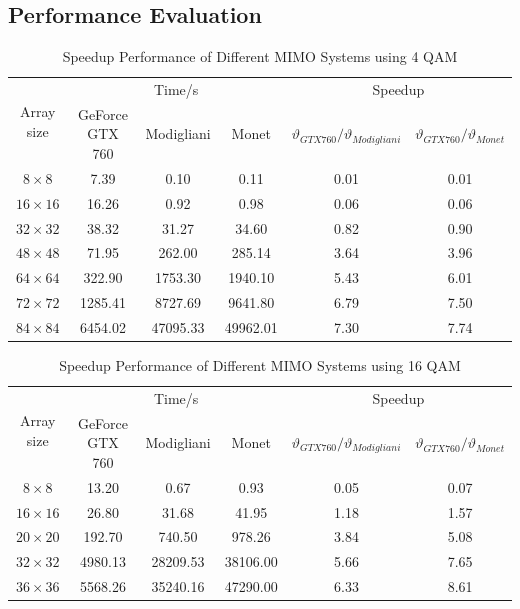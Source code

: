 \documentclass[letterpaper, 10pt, conference,twoside]{ieeeconf}
\begin{document}
\subsection{Performance Evaluation}
\begin{table}[htb]
\centering
\caption{ Speedup Performance of Different MIMO Systems using 4 QAM}
\begin{tabular}{|c|c|c|c|c|c|}
\hline
\multirow{2}{*}{ Array size} & \multicolumn{3}{|c|}{Time/s} & \multicolumn{2}{|c|}{Speedup}\\
\cline{2-6}
&GeForce GTX 760 & Modigliani & Monet &  $\vartheta_{GTX 760}/\vartheta_{Modigliani}$  & $\vartheta_{GTX 760}/\vartheta_{Monet}$ \\
\hline
$8\times 8$& 7.39& 0.10&0.11 & 0.01& 0.01\\
\hline
$16\times 16$&16.26 & 0.92&0.98& 0.06& 0.06\\
\hline
$32\times 32$&38.32 & 31.27& 34.60& 0.82& 0.90\\
\hline
$48\times 48$&71.95& 262.00& 285.14& 3.64& 3.96\\
\hline
$64\times 64$& 322.90&1753.30&1940.10&5.43& 6.01 \\
\hline
$72\times 72 $&1285.41&8727.69 &9641.80 &6.79 &7.50 \\
\hline
$84\times 84$ &6454.02&47095.33&49962.01&7.30&7.74\\
\hline
\end{tabular}
\label{speedup1}
\end{table}
\begin{table}[htb]
\centering
\caption{ Speedup Performance of Different MIMO Systems using 16 QAM}
\begin{tabular}{|c|c|c|c|c|c|}
\hline
\multirow{2}{*}{ Array size} & \multicolumn{3}{|c|}{Time/s} & \multicolumn{2}{|c|}{Speedup}\\
\cline{2-6}
&GeForce GTX 760 & Modigliani & Monet &  $\vartheta_{GTX 760}/\vartheta_{Modigliani}$  &  $\vartheta_{GTX 760}/\vartheta_{Monet}$ \\
\hline
$8\times 8$&13.20& 0.67&0.93 & 0.05&0.07\\
\hline
$16\times 16$&26.80 & 31.68&41.95& 1.18& 1.57\\
\hline
$20\times 20$&192.70 & 740.50& 978.26& 3.84& 5.08\\
\hline
$32\times 32$&4980.13& 28209.53& 38106.00& 5.66& 7.65\\
\hline
$36\times 36$& 5568.26&35240.16&47290.00&6.33& 8.61 \\
\hline
\end{tabular}
\label{speedup2}
\end{table}
\end{document}

